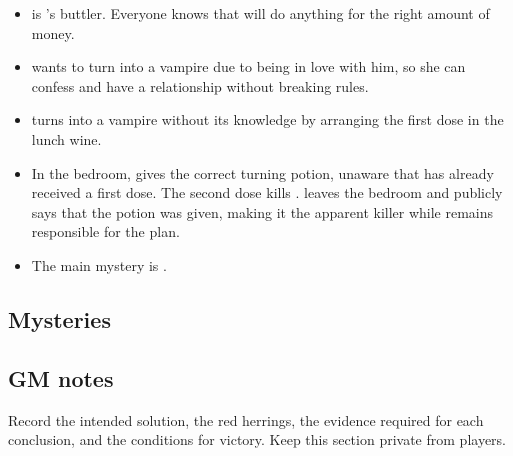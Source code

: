 \begin{itemize}
  \item {} is 's buttler. Everyone knows that  will do anything for the right amount of money.

  \item {} wants to turn  into a vampire due to being in love with him, so she can confess and have a relationship without breaking rules.
  
  \item {} turns  into a vampire without its knowledge by arranging the first dose in the lunch wine.

  \item In the bedroom,  gives  the correct turning potion, unaware that  has already received a first dose. The second dose kills .  leaves the bedroom and publicly says that the potion was given, making it the apparent killer while  remains responsible for the plan.
  
  \item The main mystery is .

\end{itemize}

\subsection{Mysteries}


\MysteryOrderGraph

\subsection{GM notes}
Record the intended solution, the red herrings, the evidence required for each conclusion, and the conditions for victory. Keep this section private from players.
